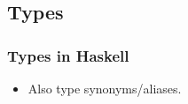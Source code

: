 \subsection{Types}

\begin{frame}[fragile]
  \frametitle{Types in Haskell}
  

	\begin{itemize}
	  \item Also type synonyms/aliases.
	\end{itemize}
\end{frame}